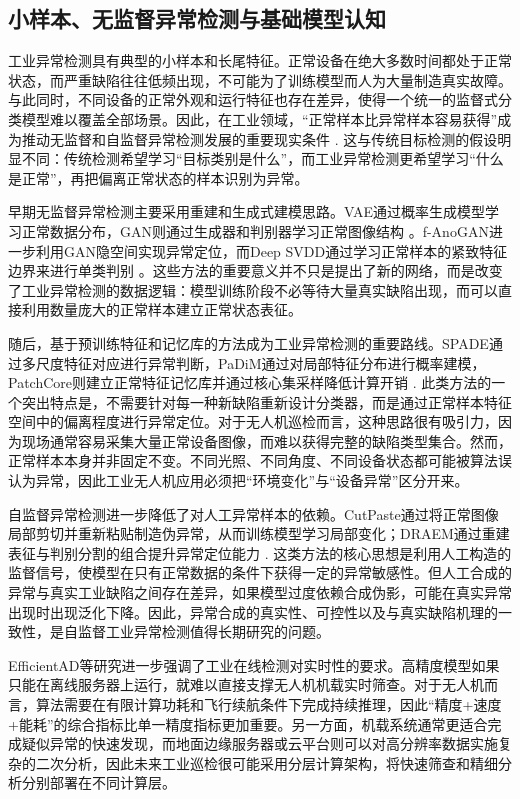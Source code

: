 \subsection{小样本、无监督异常检测与基础模型认知}

工业异常检测具有典型的小样本和长尾特征。正常设备在绝大多数时间都处于正常状态，而严重缺陷往往低频出现，不可能为了训练模型而人为大量制造真实故障。与此同时，不同设备的正常外观和运行特征也存在差异，使得一个统一的监督式分类模型难以覆盖全部场景。因此，在工业领域，“正常样本比异常样本容易获得”成为推动无监督和自监督异常检测发展的重要现实条件
\cite{taox2021survey,pang2021deep}. 这与传统目标检测的假设明显不同：传统检测希望学习“目标类别是什么”，而工业异常检测更希望学习“什么是正常”，再把偏离正常状态的样本识别为异常。

早期无监督异常检测主要采用重建和生成式建模思路。VAE通过概率生成模型学习正常数据分布，GAN则通过生成器和判别器学习正常图像结构
\cite{kingma2014auto,goodfellow2014generative}。f-AnoGAN进一步利用GAN隐空间实现异常定位，而Deep SVDD通过学习正常样本的紧致特征边界来进行单类判别
\cite{fangan2019,ruff2018deep}。这些方法的重要意义并不只是提出了新的网络，而是改变了工业异常检测的数据逻辑：模型训练阶段不必等待大量真实缺陷出现，而可以直接利用数量庞大的正常样本建立正常状态表征。

随后，基于预训练特征和记忆库的方法成为工业异常检测的重要路线。SPADE通过多尺度特征对应进行异常判断，PaDiM通过对局部特征分布进行概率建模，PatchCore则建立正常特征记忆库并通过核心集采样降低计算开销
\cite{roth2022towards}. 此类方法的一个突出特点是，不需要针对每一种新缺陷重新设计分类器，而是通过正常样本特征空间中的偏离程度进行异常定位。对于无人机巡检而言，这种思路很有吸引力，因为现场通常容易采集大量正常设备图像，而难以获得完整的缺陷类型集合。然而，正常样本本身并非固定不变。不同光照、不同角度、不同设备状态都可能被算法误认为异常，因此工业无人机应用必须把“环境变化”与“设备异常”区分开来。

自监督异常检测进一步降低了对人工异常样本的依赖。CutPaste通过将正常图像局部剪切并重新粘贴制造伪异常，从而训练模型学习局部变化；DRAEM通过重建表征与判别分割的组合提升异常定位能力
\cite{zavrtanik2021draem}. 这类方法的核心思想是利用人工构造的监督信号，使模型在只有正常数据的条件下获得一定的异常敏感性。但人工合成的异常与真实工业缺陷之间存在差异，如果模型过度依赖合成伪影，可能在真实异常出现时出现泛化下降。因此，异常合成的真实性、可控性以及与真实缺陷机理的一致性，是自监督工业异常检测值得长期研究的问题。

EfficientAD等研究进一步强调了工业在线检测对实时性的要求。高精度模型如果只能在离线服务器上运行，就难以直接支撑无人机机载实时筛查。对于无人机而言，算法需要在有限计算功耗和飞行续航条件下完成持续推理，因此“精度+速度+能耗”的综合指标比单一精度指标更加重要。另一方面，机载系统通常更适合完成疑似异常的快速发现，而地面边缘服务器或云平台则可以对高分辨率数据实施复杂的二次分析，因此未来工业巡检很可能采用分层计算架构，将快速筛查和精细分析分别部署在不同计算层。

